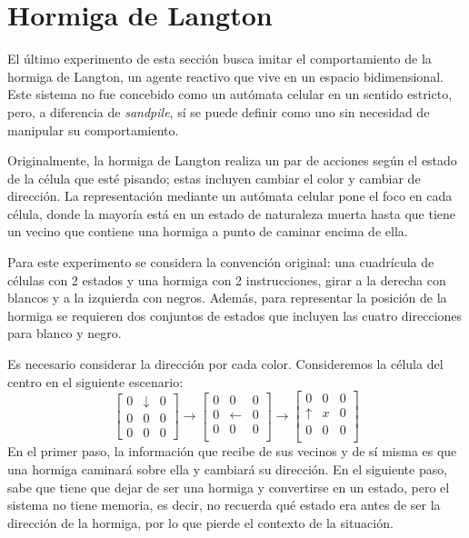 \section{Hormiga de Langton}

El último experimento de esta sección busca imitar el comportamiento de la hormiga de Langton, un agente reactivo que vive en un espacio bidimensional. Este sistema no fue concebido como un autómata celular en un sentido estricto, pero, a diferencia de \textit{sandpile}, sí se puede definir como uno sin necesidad de manipular su comportamiento. 

Originalmente, la hormiga de Langton realiza un par de acciones según el estado de la célula que esté pisando; estas incluyen cambiar el color y cambiar de dirección. La representación mediante un autómata celular pone el foco en cada célula, donde la mayoría está en un estado de naturaleza muerta hasta que tiene un vecino que contiene una hormiga a punto de caminar encima de ella.

Para este experimento se considera la convención original: una cuadrícula de células con 2 estados y una hormiga con 2 instrucciones, girar a la derecha con blancos y a la izquierda con negros. Además, para representar la posición de la hormiga se requieren dos conjuntos de estados que incluyen las cuatro direcciones para blanco y negro. 

Es necesario considerar la dirección por cada color. Consideremos la célula del centro en el siguiente escenario:
\[
\left[
\begin{matrix}
	0 & \downarrow & 0 \\
	0 & 0 & 0 \\
	0 & 0 & 0 
\end{matrix} \right] \rightarrow
\left[ \begin{matrix}
	0 & 0 & 0 \\
	0 & \leftarrow & 0 \\
	0 & 0& 0 \\
\end{matrix}  \right]\rightarrow
\left[ \begin{matrix}
0 & 0 & 0 \\
\uparrow & x & 0 \\
0 & 0& 0 \\
\end{matrix}  \right]
\]
En el primer paso, la información que recibe de sus vecinos y de sí misma es que una hormiga caminará sobre ella y cambiará su dirección. En el siguiente paso, sabe que tiene que dejar de ser una hormiga y convertirse en un estado, pero el sistema no tiene memoria, es decir, no recuerda qué estado era antes de ser la dirección de la hormiga, por lo que pierde el contexto de la situación.

